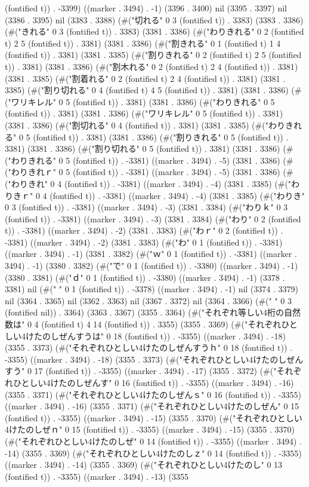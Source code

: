 (fontified t)) . -3399) ((marker . 3494) . -1) (3396 . 3400) nil (3395 . 3397) nil (3386 . 3395) nil (3383 . 3388) (#("切れる" 0 3 (fontified t)) . 3383) (3383 . 3386) (#("きれる" 0 3 (fontified t)) . 3383) (3381 . 3386) (#("わりきれる" 0 2 (fontified t) 2 5 (fontified t)) . 3381) (3381 . 3386) (#("割きれる" 0 1 (fontified t) 1 4 (fontified t)) . 3381) (3381 . 3385) (#("割りきれる" 0 2 (fontified t) 2 5 (fontified t)) . 3381) (3381 . 3386) (#("割木れる" 0 2 (fontified t) 2 4 (fontified t)) . 3381) (3381 . 3385) (#("割着れる" 0 2 (fontified t) 2 4 (fontified t)) . 3381) (3381 . 3385) (#("割り切れる" 0 4 (fontified t) 4 5 (fontified t)) . 3381) (3381 . 3386) (#("ワリキレル" 0 5 (fontified t)) . 3381) (3381 . 3386) (#("わりきれる" 0 5 (fontified t)) . 3381) (3381 . 3386) (#("ワリキレル" 0 5 (fontified t)) . 3381) (3381 . 3386) (#("割切れる" 0 4 (fontified t)) . 3381) (3381 . 3385) (#("わりきれる" 0 5 (fontified t)) . 3381) (3381 . 3386) (#("割りきれる" 0 5 (fontified t)) . 3381) (3381 . 3386) (#("割り切れる" 0 5 (fontified t)) . 3381) (3381 . 3386) (#("わりきれる" 0 5 (fontified t)) . -3381) ((marker . 3494) . -5) (3381 . 3386) (#("わりきれｒ" 0 5 (fontified t)) . -3381) ((marker . 3494) . -5) (3381 . 3386) (#("わりきれ" 0 4 (fontified t)) . -3381) ((marker . 3494) . -4) (3381 . 3385) (#("わりきｒ" 0 4 (fontified t)) . -3381) ((marker . 3494) . -4) (3381 . 3385) (#("わりき" 0 3 (fontified t)) . -3381) ((marker . 3494) . -3) (3381 . 3384) (#("わりｋ" 0 3 (fontified t)) . -3381) ((marker . 3494) . -3) (3381 . 3384) (#("わり" 0 2 (fontified t)) . -3381) ((marker . 3494) . -2) (3381 . 3383) (#("わｒ" 0 2 (fontified t)) . -3381) ((marker . 3494) . -2) (3381 . 3383) (#("わ" 0 1 (fontified t)) . -3381) ((marker . 3494) . -1) (3381 . 3382) (#("ｗ" 0 1 (fontified t)) . -3381) ((marker . 3494) . -1) (3380 . 3382) (#("で" 0 1 (fontified t)) . -3380) ((marker . 3494) . -1) (3380 . 3381) (#("ｄ" 0 1 (fontified t)) . -3380) ((marker . 3494) . -1) (3378 . 3381) nil (#(" " 0 1 (fontified t)) . -3378) ((marker . 3494) . -1) nil (3374 . 3379) nil (3364 . 3365) nil (3362 . 3363) nil (3367 . 3372) nil (3364 . 3366) (#("   " 0 3 (fontified nil)) . 3364) (3363 . 3367) (3355 . 3364) (#("それぞれ等しい4桁の自然数は" 0 4 (fontified t) 4 14 (fontified t)) . 3355) (3355 . 3369) (#("それぞれひとしい4けたのしぜんすうは" 0 18 (fontified t)) . -3355) ((marker . 3494) . -18) (3355 . 3373) (#("それぞれひとしい4けたのしぜんすうｈ" 0 18 (fontified t)) . -3355) ((marker . 3494) . -18) (3355 . 3373) (#("それぞれひとしい4けたのしぜんすう" 0 17 (fontified t)) . -3355) ((marker . 3494) . -17) (3355 . 3372) (#("それぞれひとしい4けたのしぜんす" 0 16 (fontified t)) . -3355) ((marker . 3494) . -16) (3355 . 3371) (#("それぞれひとしい4けたのしぜんｓ" 0 16 (fontified t)) . -3355) ((marker . 3494) . -16) (3355 . 3371) (#("それぞれひとしい4けたのしぜん" 0 15 (fontified t)) . -3355) ((marker . 3494) . -15) (3355 . 3370) (#("それぞれひとしい4けたのしぜｎ" 0 15 (fontified t)) . -3355) ((marker . 3494) . -15) (3355 . 3370) (#("それぞれひとしい4けたのしぜ" 0 14 (fontified t)) . -3355) ((marker . 3494) . -14) (3355 . 3369) (#("それぞれひとしい4けたのしｚ" 0 14 (fontified t)) . -3355) ((marker . 3494) . -14) (3355 . 3369) (#("それぞれひとしい4けたのし" 0 13 (fontified t)) . -3355) ((marker . 3494) . -13) (3355 